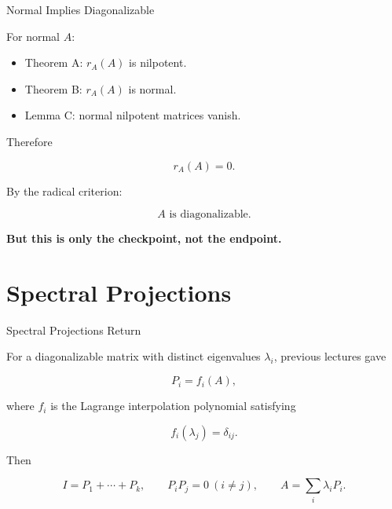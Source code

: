 \documentclass[10pt]{beamer}
\theoremstyle{definition}
\newcommand{\x}[1]{\alert{\textbf{#1}}}
\begin{document}
\begin{frame}{Normal Implies Diagonalizable}

For normal $A$:

\begin{itemize}
\item Theorem A: $r_A(A)$ is nilpotent.
\item Theorem B: $r_A(A)$ is normal.
\item Lemma C: normal nilpotent matrices vanish.
\end{itemize}

\vfill

Therefore

$$
r_A(A)=0.
$$

\vfill

By the radical criterion:

$$
\boxed{A\text{ is diagonalizable}.}
$$

\vfill

\begin{center}
\x{But this is only the checkpoint, not the endpoint.}
\end{center}

\end{frame}

\section{Spectral Projections}

\begin{frame}{Spectral Projections Return}

For a diagonalizable matrix with distinct eigenvalues $\lambda_i$, previous lectures gave

$$
P_i=f_i(A),
$$

where $f_i$ is the Lagrange interpolation polynomial satisfying

$$
f_i(\lambda_j)=\delta_{ij}.
$$

\vfill

Then

$$
I=P_1+\cdots+P_k,
\qquad
P_iP_j=0\ (i\ne j),
\qquad
A=\sum_i\lambda_iP_i.
$$

\end{frame}
\end{document}
